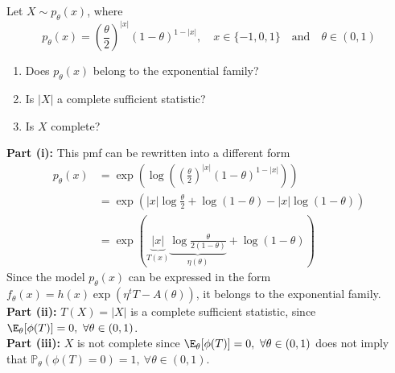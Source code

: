 \documentclass{article}
\begin{document}
\MakeAssignmentTitle




\begin{homeworkProblem}

    Let $X \sim p_\theta(x)$, where
    \[
        p_\theta(x) = \left(\frac{\theta}{2}\right)^{|x|} (1 - \theta)^{1 - |x|}, \quad x \in \{-1, 0, 1\} \quad \text{and} \quad \theta \in (0, 1)
    \]
    \begin{enumerate}[label=\roman*), topsep=5pt, itemsep=5pt]
        \item Does $p_\theta(x)$ belong to the exponential family?
        \item Is $|X|$ a complete sufficient statistic?
        \item Is $X$ complete? \newline
    \end{enumerate}

    \solution

    \textbf{Part (i):} This pmf can be rewritten into a different form
    \begin{align*}
        p_\theta(x) & = \exp \left( \log \left( \left(\frac{\theta}{2}\right)^{|x|} (1 - \theta)^{1 - |x|} \right) \right)                            \\
                    & = \exp \left( |x| \log \frac{\theta}{2} + \log (1 - \theta) - |x| \log (1 - \theta) \right)                                     \\
                    & = \exp \left( \underbrace{|x|}_{T(x)} \underbrace{\log \frac{\theta}{2(1 - \theta)}}_{\eta(\theta)} + \log (1 - \theta) \right)
    \end{align*}
    Since the model $p_\theta(x)$ can be expressed in the form $f_\theta(x) = h(x) \exp(\eta^t T - A(\theta))$, it belongs to the exponential family. \\

    \textbf{Part (ii):} $T(X) = |X|$ is a complete sufficient statistic, since $\E_\theta[\phi(T)] = 0 ,\ \forall \theta \in (0, 1)$.  \\

    \textbf{Part (iii):} $X$ is not complete since $\E_\theta[\phi(T)] = 0, \ \forall \theta \in (0, 1)$ does not imply that $ \mathbb{P}_\theta(\phi(T) = 0) = 1, \ \forall \theta \in (0, 1)$.

\end{homeworkProblem}
\end{document}
